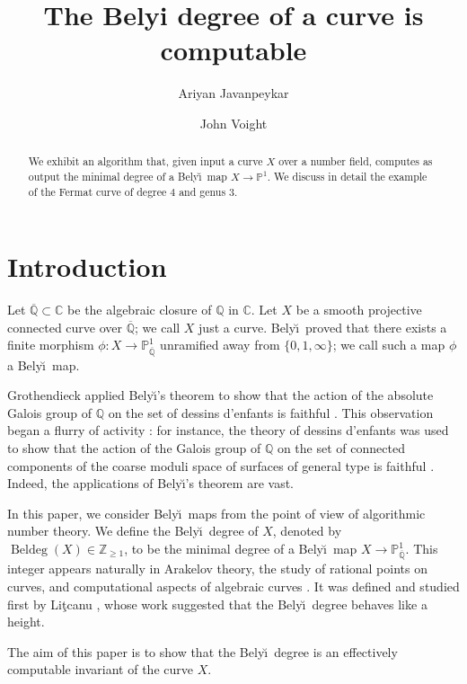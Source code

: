 \documentclass{amsproc}
\title{The Belyi degree of a curve is computable}
\author{Ariyan Javanpeykar}
\author{John Voight}
\numberwithin{equation}{section}
\numberwithin{figure}{section}
\theoremstyle{definition}
\theoremstyle{remark}
\DeclareMathOperator{\Beldeg}{Beldeg}
\newcommand{\Qbar}{\overline{\mathbb{Q}}}
\newcommand\PP{\mathbb{P}}
\newcommand\QQ{\mathbb{Q}}
\newcommand\CC{\mathbb{C}}
\newcommand\Z{\mathbb{Z}}
\newcommand{\p}{\mathbb{P}}
\renewcommand{\geq}{\geqslant}
\newcommand{\Belyi}{Bely\u{\i}}
\newcommand{\defi}[1]{\textsf{#1}} 	%
\begin{document}
\begin{abstract}
We exhibit an algorithm that, given input a curve $X$ over a number field, computes as output the minimal degree of a \Belyi\ map $X \to \PP^1$.  We discuss in detail the example of the Fermat curve of degree $4$ and genus $3$.
\end{abstract}
 
\maketitle

\section{Introduction}
Let $\Qbar \subset \CC$ be the algebraic closure of $\QQ$ in $\CC$.  Let $X$ be a smooth projective connected curve over $\Qbar$; we call $X$ just a \defi{curve}.  \Belyi\ proved \cite{Belyi1,Belyi2} that there exists a finite morphism $\phi\colon X\to \p^1_{\Qbar}$ unramified away from $\{0,1,\infty\}$; we call such a map $\phi$ a \defi{\Belyi\ map}.  

Grothendieck applied \Belyi's theorem to show that the action of the absolute Galois group of $\mathbb Q$ on the set of   dessins d'enfants is faithful \cite[Theorem 4.7.7]{Szamuely}.  This observation began a flurry of activity  \cite{Schneps}: for instance, the theory of dessins d'enfants was used to show that  the action of the Galois group of $\mathbb Q$ on the set of connected components of the coarse moduli space of surfaces of general type  is  faithful   \cite{BCG, Torres}.  Indeed, the applications of \Belyi's theorem are vast.

In this paper, we consider \Belyi\ maps from the point of view of algorithmic number theory.  We define the \defi{\Belyi\ degree} of $X$, denoted by $\Beldeg(X) \in \Z_{\geq 1}$, to be the minimal degree of a \Belyi\ map $X\to \p^1_{\Qbar}$.  
This integer appears naturally    in Arakelov theory,    the study of rational points on curves, and computational aspects of algebraic curves \cite{BiSt, J, JvK, SijslingVoight}.   It was defined and studied first by 
Li\c{t}canu \cite{Litcanu}, whose work suggested that the \Belyi\ degree behaves like a height.

The aim of this paper is to show that the \Belyi\ degree is an effectively computable invariant of the curve $X$.  
\end{document}
